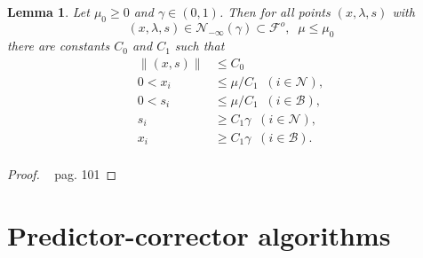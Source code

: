 \documentclass[a4paper,10 pt,titlepage,twoside]{book}
\theoremstyle{plain}
\newtheorem{lem}[thm]{Lemma}
\theoremstyle{definition}
\theoremstyle{remark}
\begin{document}
\begin{lem}
	Let $\mu_{0}\geq 0$ and $\gamma\in(0,1)$. Then for all points $(x,\lambda,s)$ with
	\begin{equation*}
	(x,\lambda,s)\in\mathcal{N}_{-\infty}(\gamma)\subset\mathcal{F}^{o}, \;\; \mu \leq \mu_{0}
	\end{equation*}
	there are constants $C_{0}$ and $C_{1}$ such that
\begin{align*}
\lVert(x,s) \rVert&\leq C_{0}\\0< x_{i}&\leq \mu/C_{1}\;\; (i \in\mathcal{N}),\\
0< s_{i}&\leq \mu/C_{1}\;\; (i \in\mathcal{B}),\\ 
s_{i}&\geq C_{1}\gamma \;\; (i \in\mathcal{N}),\\
x_{i}&\geq C_{1}\gamma \;\; (i \in\mathcal{B}).\\
\end{align*}
\end{lem}
\begin{proof}
~\cite{Wright} pag. 101
\end{proof}
\newpage
\section{Predictor-corrector algorithms}
\end{document}
